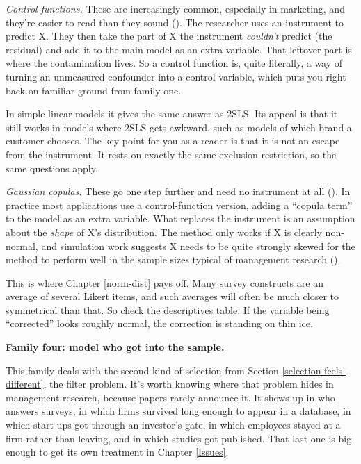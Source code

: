 \documentclass[
]{book}
\begin{document}
\emph{Control functions.} These are increasingly common, especially in marketing, and they're easier to read than they sound (). The researcher uses an instrument to predict X. They then take the part of X the instrument \emph{couldn't} predict (the residual) and add it to the main model as an extra variable. That leftover part is where the contamination lives. So a control function is, quite literally, a way of turning an unmeasured confounder into a control variable, which puts you right back on familiar ground from family one.

In simple linear models it gives the same answer as 2SLS. Its appeal is that it still works in models where 2SLS gets awkward, such as models of which brand a customer chooses. The key point for you as a reader is that it is not an escape from the instrument. It rests on exactly the same exclusion restriction, so the same questions apply.

\emph{Gaussian copulas.} These go one step further and need no instrument at all (). In practice most applications use a control-function version, adding a ``copula term'' to the model as an extra variable. What replaces the instrument is an assumption about the \emph{shape} of X's distribution. The method only works if X is clearly non-normal, and simulation work suggests X needs to be quite strongly skewed for the method to perform well in the sample sizes typical of management research ().

This is where Chapter \ref{norm-dist} pays off. Many survey constructs are an average of several Likert items, and such averages will often be much closer to symmetrical than that. So check the descriptives table. If the variable being ``corrected'' looks roughly normal, the correction is standing on thin ice.

\textbf{Family four: model who got into the sample.}

This family deals with the second kind of selection from Section \ref{selection-feels-different}, the filter problem. It's worth knowing where that problem hides in management research, because papers rarely announce it. It shows up in who answers surveys, in which firms survived long enough to appear in a database, in which start-ups got through an investor's gate, in which employees stayed at a firm rather than leaving, and in which studies got published. That last one is big enough to get its own treatment in Chapter \ref{Issues}.
\end{document}
